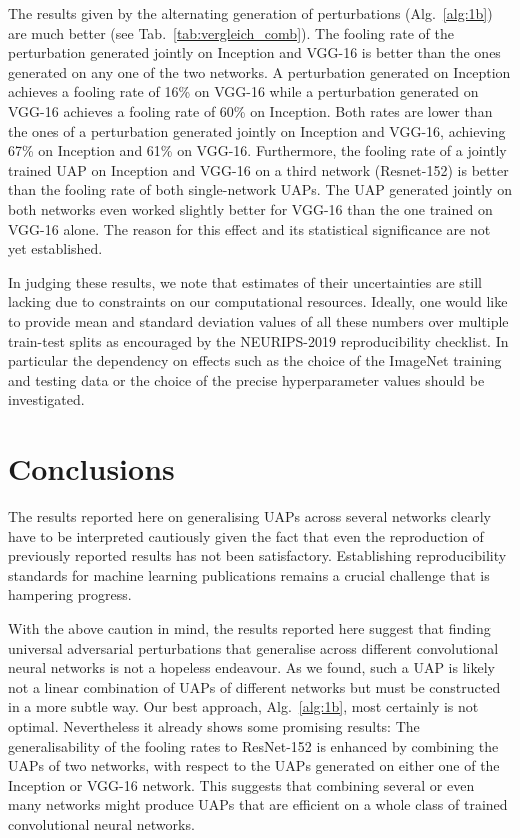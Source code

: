 \documentclass[runningheads]{llncs}
\begin{document}
The results given by the alternating generation of perturbations (Alg.~\ref{alg:1b}) are much better (see Tab.~\ref{tab:vergleich_comb}). The fooling rate of the perturbation generated jointly on Inception and VGG-16 is better than the ones generated on any one of the 
two networks. A perturbation generated on Inception achieves a fooling rate of 16\% on VGG-16 while a perturbation generated on VGG-16 achieves a fooling rate of 60\% on Inception. Both rates are lower than the ones of a perturbation generated jointly on Inception and VGG-16, achieving 67\% on Inception and 61\% on VGG-16. Furthermore, the fooling rate of a jointly trained UAP on Inception and VGG-16 on a third network (Resnet-152) is better than the fooling rate of both single-network UAPs. The UAP generated jointly on both networks even worked slightly better for VGG-16 than the one trained on VGG-16 alone. The reason for this effect and its statistical significance are not yet established. 

In judging these results, we note that estimates of their uncertainties are still lacking due to constraints on our computational resources. Ideally, one would like to provide mean and standard deviation values of all these numbers over multiple train-test splits as encouraged by the NEURIPS-2019 reproducibility checklist. In particular the dependency on effects such as the choice of the ImageNet training and testing data or the choice of the precise hyperparameter values should be investigated. 

\section{Conclusions}\label{sec:conclusion}
The results reported here on generalising UAPs across several networks clearly have to be interpreted cautiously given the fact that even the reproduction of previously reported results has not been satisfactory. Establishing reproducibility standards for machine learning publications remains a crucial challenge that is hampering progress.

With the above caution in mind, the results reported here suggest that finding universal adversarial perturbations that generalise across different convolutional neural networks is not a hopeless endeavour. As we found, such a UAP is likely not a linear combination of UAPs of different networks but must be constructed in a more subtle way. Our best approach, Alg.~\ref{alg:1b}, most certainly is not optimal. Nevertheless it already shows some promising results: The generalisability of the fooling rates to ResNet-152 is enhanced by combining the UAPs of two networks, with respect to the UAPs generated on either one of the Inception or VGG-16 network. This suggests that combining several or even many networks might produce UAPs that are efficient on a whole class of trained 
convolutional neural networks.


\end{document}
